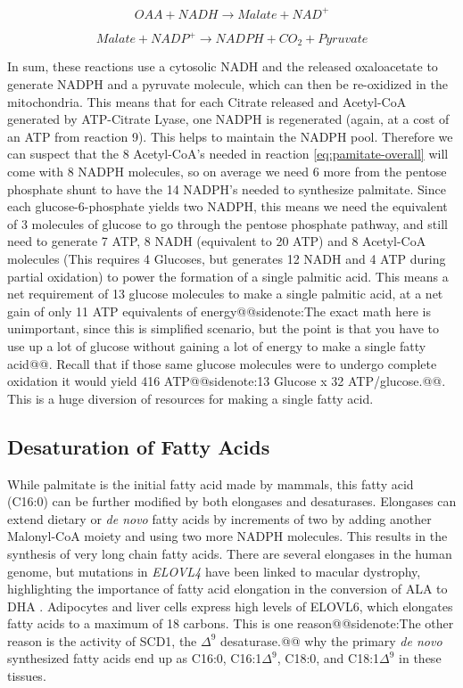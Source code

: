 \documentclass{tufte-handout}
\makeatletter
\def\sidenote#1{@@sidenote:#1@@}
\makeatother
\begin{document}
\begin{equation}\label{eq:me}
OAA + NADH  \rightarrow Malate + NAD^+
\end{equation}

\begin{equation}\label{eq:mdh}
Malate + NADP^+  \rightarrow NADPH + CO_2 + Pyruvate
\end{equation}


In sum, these reactions use a cytosolic NADH and the released oxaloacetate to generate NADPH and a pyruvate molecule, which can then be re-oxidized in the mitochondria.  This means that for each Citrate released and Acetyl-CoA generated by ATP-Citrate Lyase, one NADPH is regenerated (again, at a cost of an ATP from reaction 9). This helps to maintain the NADPH pool. Therefore we can suspect that the 8 Acetyl-CoA's needed in reaction \ref{eq:pamitate-overall} will come with 8 NADPH molecules, so on average we need 6 more from the pentose phosphate shunt to have the 14 NADPH's needed to synthesize palmitate. Since each glucose-6-phosphate yields two NADPH, this means we need the equivalent of 3 molecules of glucose to go through the pentose phosphate pathway, and still need to generate 7 ATP, 8 NADH (equivalent to 20 ATP) and 8 Acetyl-CoA molecules (This requires  4 Glucoses, but generates 12 NADH and 4 ATP during partial oxidation) to power the formation of a single palmitic acid.  This means a net requirement of 13 glucose molecules to make a single palmitic acid, at a net gain of only 11 ATP equivalents of energy\sidenote{The exact math here is unimportant, since this is simplified scenario, but the point is that you have to use up a lot of glucose without gaining a lot of energy to make a single fatty acid}.  Recall that if those same glucose molecules were to undergo complete oxidation it would yield 416 ATP\sidenote{13 Glucose x 32 ATP/glucose.}.  This is a huge diversion of resources for making a single fatty acid.


\subsection{Desaturation of Fatty Acids}

While palmitate is the initial fatty acid made by mammals, this fatty acid (C16:0) can be further modified by both elongases and desaturases.  Elongases can extend dietary or \textit{de novo} fatty acids by increments of two by adding another Malonyl-CoA moiety and using two more NADPH molecules.  This results in the synthesis of very long chain fatty acids.  There are several elongases in the human genome, but mutations in \textit{ELOVL4} have been linked to macular dystrophy, highlighting the importance of fatty acid elongation in the conversion of ALA to DHA \citep{Zhang2001}.  Adipocytes and liver cells express high levels of ELOVL6, which elongates fatty acids to a maximum of 18 carbons.  This is one reason\sidenote{The other reason is the activity of SCD1, the $\Delta^9$ desaturase.} why the primary \textit{de novo} synthesized fatty acids end up as C16:0, C16:1$\Delta^9$, C18:0, and C18:1$\Delta^9$ in these tissues.
\end{document}
